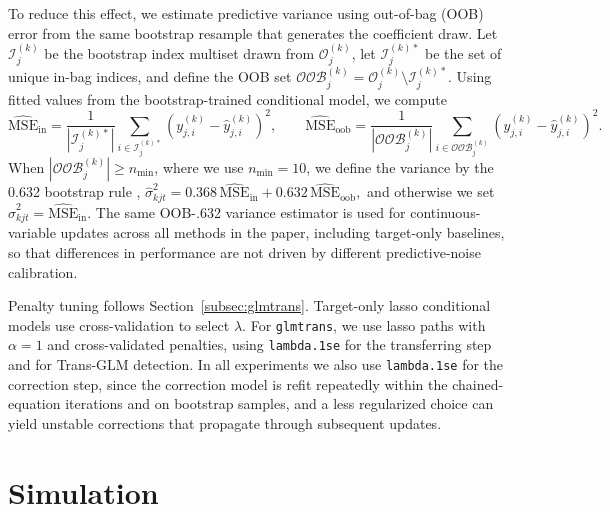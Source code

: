 \documentclass[12pt]{article}
\begin{document}
To reduce this effect, we estimate predictive variance using out-of-bag (OOB) error from the same bootstrap resample that generates the coefficient draw. Let $\mathcal{I}^{(k)}_j$ be the bootstrap index multiset drawn from $\mathcal{O}^{(k)}_j$, let $\mathcal{I}^{(k)\ast}_j$ be the set of unique in-bag indices, and define the OOB set
\(\mathcal{OOB}^{(k)}_j=\mathcal{O}^{(k)}_j\setminus \mathcal{I}^{(k)\ast}_j.\)
Using fitted values from the bootstrap-trained conditional model, we compute
\[
\widehat{\mathrm{MSE}}_{\mathrm{in}}
=\frac{1}{|\mathcal{I}^{(k)\ast}_j|}\sum_{i\in \mathcal{I}^{(k)\ast}_j}
\left(y^{(k)}_{j,i}-\hat{y}^{(k)}_{j,i}\right)^2,\qquad
\widehat{\mathrm{MSE}}_{\mathrm{oob}}
=\frac{1}{|\mathcal{OOB}^{(k)}_j|}\sum_{i\in \mathcal{OOB}^{(k)}_j}
\left(y^{(k)}_{j,i}-\hat{y}^{(k)}_{j,i}\right)^2.
\]
When $|\mathcal{OOB}^{(k)}_j|\ge n_{\min}$, where we use $n_{\min}=10$, we define the variance by the 0.632 bootstrap rule \citep{efron_improvements_1997},
\(\hat{\sigma}^2_{kjt}
=0.368\,\widehat{\mathrm{MSE}}_{\mathrm{in}} + 0.632\,\widehat{\mathrm{MSE}}_{\mathrm{oob}},\)
and otherwise we set $\hat{\sigma}^2_{kjt}=\widehat{\mathrm{MSE}}_{\mathrm{in}}$. The same OOB-.632 variance estimator is used for continuous-variable updates across all methods in the paper, including target-only baselines, so that differences in performance are not driven by different predictive-noise calibration.

Penalty tuning follows Section~\ref{subsec:glmtrans}. Target-only lasso conditional models use cross-validation to select $\lambda$. For \texttt{glmtrans}, we use lasso paths with $\alpha=1$ and cross-validated penalties, using \texttt{lambda.1se} for the transferring step and for Trans-GLM detection. In all experiments we also use \texttt{lambda.1se} for the correction step, since the correction model is refit repeatedly within the chained-equation iterations and on bootstrap samples, and a less regularized choice can yield unstable corrections that propagate through subsequent updates.

\section{Simulation}
\label{sec:simulation}
\end{document}
